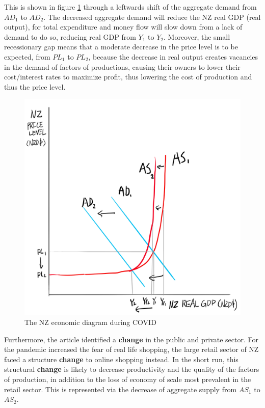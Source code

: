 \documentclass[a4paper,12pt]{article}
\begin{document}
This is shown in figure \ref{fig:asad} through a leftwards shift of the aggregate demand from $AD_1$ to $AD_2$. The decreased aggregate demand will reduce the NZ real GDP (real output), for total expenditure and money flow will slow down from a lack of demand to do so, reducing real GDP from $Y_1$ to $Y_2$. Moreover, the small recessionary gap means that a moderate decrease in the price level is to be expected, from $PL_1$ to $PL_2$, because the decrease in real output creates vacancies in the demand of factors of productions, causing their owners to lower their cost/interest rates to maximize profit, thus lowering the cost of production and thus the price level.

\begin{figure}[H]
    \centering
    \includegraphics[scale=0.6]{assets/asad.png}
    \caption{The NZ economic diagram during COVID}
    \label{fig:asad}
\end{figure}

Furthermore, the article identified a \textbf{change} in the public and private sector. For the pandemic increased the fear of real life shopping, the large retail sector of NZ faced a structure \textbf{change} to online shopping instead. In the short run, this structural \textbf{change} is likely to decrease productivity and the quality of the factors of production, in addition to the loss of economy of scale most prevalent in the retail sector. This is represented via the decrease of aggregate supply from $AS_1$ to $AS_2$.
\end{document}
